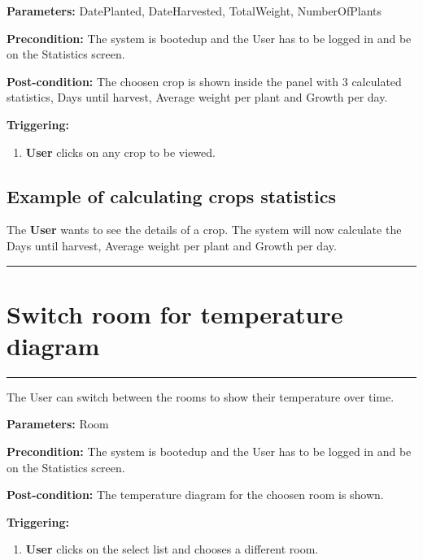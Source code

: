 \begin{description}

\item \textbf{Parameters:} DatePlanted, DateHarvested, TotalWeight, NumberOfPlants
\item \textbf{Precondition:} The system is bootedup and the User has to be
logged in and be on the Statistics screen.
\item \textbf{Post-condition:} The choosen crop is shown inside the panel with 3 calculated statistics, Days until harvest, Average weight per plant and Growth per day.
\item \textbf{Triggering:}
\begin{enumerate}

\item \textbf{User} clicks on any crop to be viewed.

\end{enumerate}
\end{description}

\subsection{Example of calculating crops statistics}
The \textbf{User} wants to see the details of a crop. The system will now calculate the Days until harvest, Average weight per plant and Growth per day.
\hfill
\vspace{0.5cm}
\hrule




\section{Switch room for temperature diagram}
\hrule
\hfill
\vspace{0.5cm}
\label{operation:Switch room for temperature diagram}

The User can switch between the rooms to show their temperature over time.

\begin{description}

\item \textbf{Parameters:} Room
\item \textbf{Precondition:} The system is bootedup and the User has to be
logged in and be on the Statistics screen.
\item \textbf{Post-condition:} The temperature diagram for the choosen room is shown.
\item \textbf{Triggering:}
\begin{enumerate}

\item \textbf{User} clicks on the select list and chooses a different room.

\end{enumerate}
\end{description}

